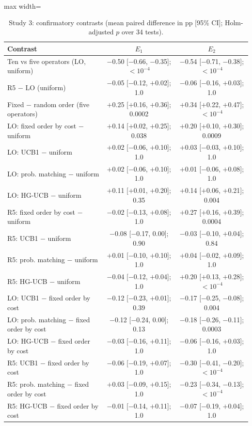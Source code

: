 \begin{table}[t]
\caption{Study 3: confirmatory contrasts (mean paired difference in pp [95\% CI]; Holm-adjusted $p$ over 34 tests).}\label{tab:s3tests}
\centering
\small
\begin{adjustbox}{max width=\linewidth}
\begin{tabular}{lcc}
\toprule
Contrast & $E_1$ & $E_2$ \\
\midrule
Ten vs five operators (LO, uniform) & $-$0.50 [$-$0.66, $-$0.35]; \ensuremath{<10^{-4}} & $-$0.54 [$-$0.71, $-$0.38]; \ensuremath{<10^{-4}} \\
R5 $-$ LO (uniform) & $-$0.05 [$-$0.12, $+$0.02]; 1.0 & $-$0.06 [$-$0.16, $+$0.03]; 1.0 \\
Fixed $-$ random order (five operators) & $+$0.25 [$+$0.16, $+$0.36]; 0.0002 & $+$0.34 [$+$0.22, $+$0.47]; \ensuremath{<10^{-4}} \\
\addlinespace
LO: fixed order by cost $-$ uniform & $+$0.14 [$+$0.02, $+$0.25]; 0.038 & $+$0.20 [$+$0.10, $+$0.30]; 0.0009 \\
LO: UCB1 $-$ uniform & $+$0.02 [$-$0.06, $+$0.10]; 1.0 & $+$0.03 [$-$0.03, $+$0.10]; 1.0 \\
LO: prob. matching $-$ uniform & $+$0.02 [$-$0.06, $+$0.10]; 1.0 & $+$0.01 [$-$0.06, $+$0.08]; 1.0 \\
LO: HG-UCB $-$ uniform & $+$0.11 [$+$0.01, $+$0.20]; 0.35 & $+$0.14 [$+$0.06, $+$0.21]; 0.004 \\
\addlinespace
R5: fixed order by cost $-$ uniform & $-$0.02 [$-$0.13, $+$0.08]; 1.0 & $+$0.27 [$+$0.16, $+$0.39]; 0.0004 \\
R5: UCB1 $-$ uniform & $-$0.08 [$-$0.17, 0.00]; 0.90 & $-$0.03 [$-$0.10, $+$0.04]; 0.84 \\
R5: prob. matching $-$ uniform & $+$0.01 [$-$0.10, $+$0.10]; 1.0 & $+$0.04 [$-$0.02, $+$0.09]; 1.0 \\
R5: HG-UCB $-$ uniform & $-$0.04 [$-$0.12, $+$0.04]; 1.0 & $+$0.20 [$+$0.13, $+$0.28]; \ensuremath{<10^{-4}} \\
\addlinespace
LO: UCB1 $-$ fixed order by cost & $-$0.12 [$-$0.23, $+$0.01]; 0.39 & $-$0.17 [$-$0.25, $-$0.08]; 0.004 \\
LO: prob. matching $-$ fixed order by cost & $-$0.12 [$-$0.24, 0.00]; 0.13 & $-$0.18 [$-$0.26, $-$0.11]; 0.0003 \\
LO: HG-UCB $-$ fixed order by cost & $-$0.03 [$-$0.16, $+$0.11]; 1.0 & $-$0.06 [$-$0.16, $+$0.03]; 1.0 \\
\addlinespace
R5: UCB1 $-$ fixed order by cost & $-$0.06 [$-$0.19, $+$0.07]; 1.0 & $-$0.30 [$-$0.41, $-$0.20]; \ensuremath{<10^{-4}} \\
R5: prob. matching $-$ fixed order by cost & $+$0.03 [$-$0.09, $+$0.15]; 1.0 & $-$0.23 [$-$0.34, $-$0.13]; \ensuremath{<10^{-4}} \\
R5: HG-UCB $-$ fixed order by cost & $-$0.01 [$-$0.14, $+$0.11]; 1.0 & $-$0.07 [$-$0.19, $+$0.04]; 1.0 \\
\bottomrule
\end{tabular}
\end{adjustbox}
\end{table}
